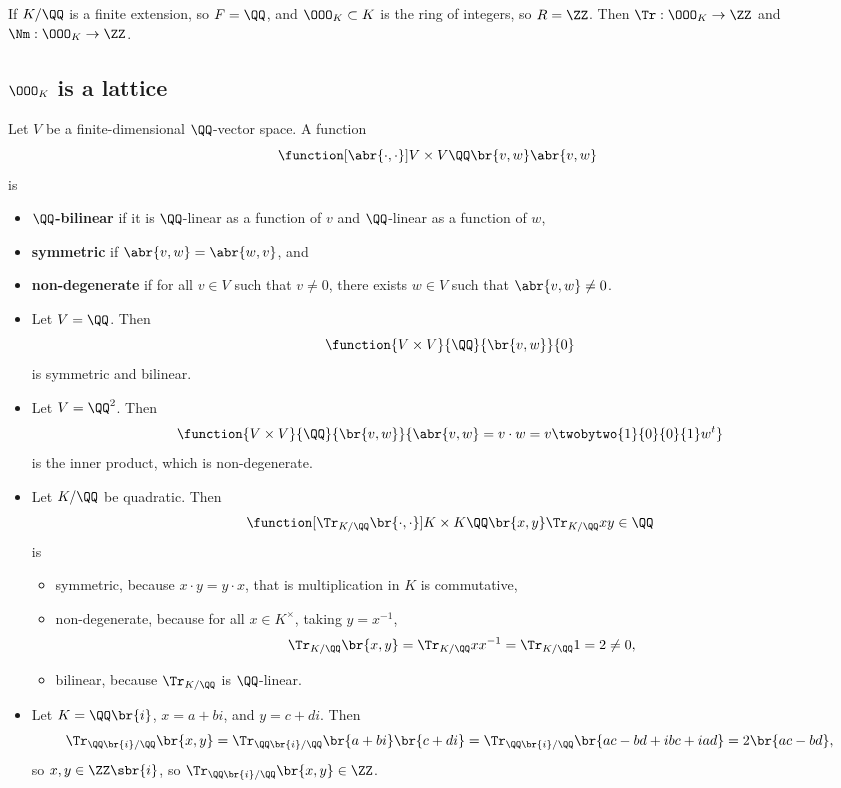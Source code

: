 \begin{corollary}
If $ K / \QQ $ is a finite extension, so $ F = \QQ $, and $ \OOO_K \subset K $ is the ring of integers, so $ R = \ZZ $. Then $ \Tr : \OOO_K \to \ZZ $ and $ \Nm : \OOO_K \to \ZZ $.
\end{corollary}

\subsection{\texorpdfstring{$ \OOO_K $}{OK} is a lattice}

\begin{definition}
Let $ V $ be a finite-dimensional $ \QQ $-vector space. A function
$$ \function[\abr{\cdot, \cdot}]{V \times V}{\QQ}{\br{v, w}}{\abr{v, w}} $$
is
\begin{itemize}
\item \textbf{$ \QQ $-bilinear} if it is $ \QQ $-linear as a function of $ v $ and $ \QQ $-linear as a function of $ w $,
\item \textbf{symmetric} if $ \abr{v, w} = \abr{w, v} $, and
\item \textbf{non-degenerate} if for all $ v \in V $ such that $ v \ne 0 $, there exists $ w \in V $ such that $ \abr{v, w} \ne 0 $.
\end{itemize}
\end{definition}

\begin{example*}
\hfill
\begin{itemize}
\item Let $ V = \QQ $. Then
$$ \function{V \times V}{\QQ}{\br{v, w}}{0} $$
is symmetric and bilinear.

\pagebreak

\item Let $ V = \QQ^2 $. Then
$$ \function{V \times V}{\QQ}{\br{v, w}}{\abr{v, w} = v \cdot w = v\twobytwo{1}{0}{0}{1}w^t} $$
is the inner product, which is non-degenerate.
\item Let $ K / \QQ $ be quadratic. Then
$$ \function[\Tr_{K / \QQ}\br{\cdot, \cdot}]{K \times K}{\QQ}{\br{x, y}}{\Tr_{K / \QQ} xy \in \QQ} $$
is
\begin{itemize}
\item symmetric, because $ x \cdot y = y \cdot x $, that is multiplication in $ K $ is commutative,
\item non-degenerate, because for all $ x \in K^\times $, taking $ y = x^{-1} $,
$$ \Tr_{K / \QQ}\br{x, y} = \Tr_{K / \QQ} xx^{-1} = \Tr_{K / \QQ} 1 = 2 \ne 0, $$
\item bilinear, because $ \Tr_{K / \QQ} $ is $ \QQ $-linear.
\end{itemize}
\item Let $ K = \QQ\br{i} $, $ x = a + bi $, and $ y = c + di $. Then
$$ \Tr_{\QQ\br{i} / \QQ}\br{x, y} = \Tr_{\QQ\br{i} / \QQ} \br{a + bi}\br{c + di} = \Tr_{\QQ\br{i} / \QQ} \br{ac - bd + ibc + iad} = 2\br{ac - bd}, $$
so $ x, y \in \ZZ\sbr{i} $, so $ \Tr_{\QQ\br{i} / \QQ}\br{x, y} \in \ZZ $.
\end{itemize}
\end{example*}

